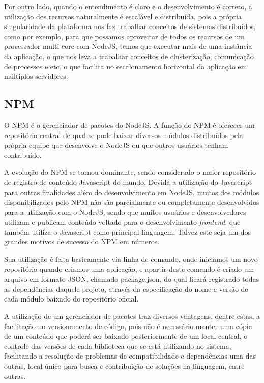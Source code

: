 Por outro lado, quando o entendimento é claro e o desenvolvimento é correto, a utilização dos recursos naturalmente é escalável e distribuída, pois a própria singularidade da plataforma nos faz trabalhar conceitos de sistemas distribuídos, como por exemplo, para que possamos aproveitar de todos os recursos de um processador multi-core com NodeJS, temos que executar mais de uma instância da aplicação, o que nos leva a trabalhar conceitos de clusterização, comunicação de processos e etc, o que facilita no escalonamento horizontal da aplicação em múltiplos servidores.

\subsection{NPM}
O NPM \cite{npm} é o gerenciador de pacotes do NodeJS. A função do NPM é oferecer um repositório central de qual se pode baixar diversos módulos distribuídos pela própria equipe que desenvolve o NodeJS ou que outros usuários tenham contribuído.

A evolução do NPM se tornou dominante, sendo considerado o maior repositório de registro de conteúdo Javascript do mundo. Devida a utilização do Javascript para outras finalidades além do desenvolvimento em NodeJS, muitos dos módulos disponibilizados pelo NPM não são parcialmente ou completamente desenvolvidos para a utilização com o NodeJS, sendo que muitos usuários e desenvolvedores utilizam e publicam conteúdo voltado para o desenvolvimento \textit{frontend}, que também utiliza o Javascript como principal linguagem. Talvez este seja um dos grandes motivos de sucesso do NPM em números.

Sua utilização é feita basicamente via linha de comando, onde iniciamos um novo repositório quando criamos uma aplicação, e apartir deste comando é criado um arquivo em formato JSON, chamado package.json, do qual ficará registrado todas as dependências daquele projeto, através da especificação do nome e versão de cada módulo baixado do repositório oficial.

A utilização de um gerenciador de pacotes traz diversos vantagens, dentre estas, a facilitação no versionamento de código, pois não é necessário manter uma cópia de um conteúdo que poderá ser baixado posteriormente de um local central, o controle das versões de cada biblioteca que se está utilizando no sistema, facilitando a resolução de problemas de compatibilidade e dependências uma das outras, local único para busca e contribuição de soluções na linguagem, entre outras.

